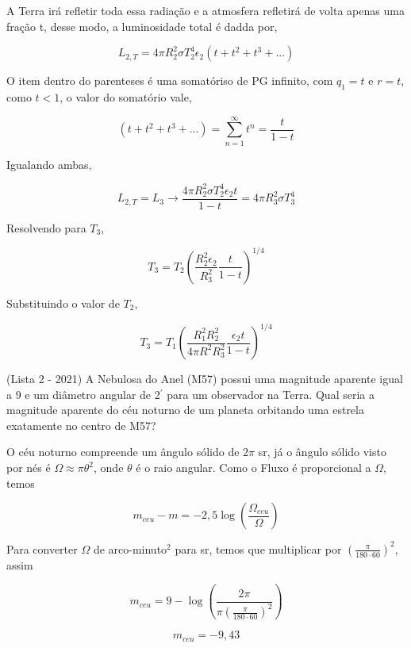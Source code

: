 \documentclass[11pt]{article}
\begin{document}
\begin{pproblem}
\begin{pssolution*}{}{}
\begin{alternativas}
         A Terra irá refletir toda essa radiação e a atmosfera refletirá de volta apenas uma fração t, desse modo, a luminosidade total é dadda por, 

         \[L_{2,T} = 4\pi R_2^2\sigma T_2^4\epsilon_2 (t+t^2+t^3+...)\]

         O item dentro do parenteses é uma somatóriso de PG infinito, com \(q_1 = t\) e \(r = t\), como \(t<1\), o valor do somatório vale, 

         \[(t+t^2+t^3+...) = \sum_{n=1}^{\infty}t^n = \frac{t}{1-t}\]

         Igualando ambas, 

         \[L_{2,T} = L_3 \rightarrow \frac{4\pi R_2^2\sigma T_2^4 \epsilon_2 t}{1-t} = 4\pi R_3^2\sigma T_3^4\]

         Resolvendo para \(T_3\), 

         \[T_3 = T_2\left(\frac{R_2^2\epsilon_2}{R_3^2}\frac{t}{1-t}\right)^{1/4}\]

         Substituindo o valor de \(T_2\), 

         \[\boxed{T_3 =T_1\left(\frac{R_1^2R_2^2}{4\pi R^2R_3^2}\frac{\epsilon_2t}{1-t}\right)^{1/4}}\]


    \end{alternativas}
    
\end{pssolution*}
\end{pproblem}


\begin{pproblem}(Lista 2 - 2021)
    A Nebulosa do Anel (M57) possui uma magnitude aparente igual a 9 e um
diâmetro angular de 2$^{\prime}$ para um observador na Terra. Qual seria a magnitude aparente do céu
noturno de um planeta orbitando uma estrela exatamente no centro de M57?
\begin{pssolution*}{}{}
    O céu noturno compreende um ângulo sólido de \(2\pi\) sr, já o ângulo sólido visto por nés é \(\Omega \approx \pi \theta^2\), onde \(\theta\) é o raio angular. Como o Fluxo é proporcional a \(\Omega\), temos

    \[m_{ceu}-m = -2,5\log\left(\frac{\Omega_{ceu}}{\Omega}\right)\]

    Para converter \(\Omega\) de arco-minuto\(^2\) para sr, temos que multiplicar por \(\left(\frac{\pi}{180\cdot60}\right)^2\), assim
    
    \[m_{ceu} = 9 - \log\left(\frac{2\pi}{\pi(\frac{\pi}{180\cdot60})^2}\right)\]

    \[\boxed{m_{ceu} = -9,43}\]
\end{pssolution*}
\end{pproblem}
\end{document}
